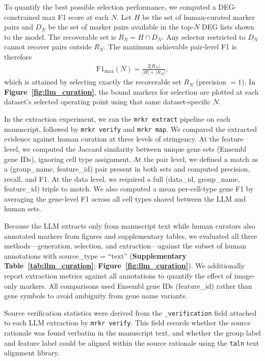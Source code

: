 \documentclass[10pt,twocolumn]{article}
\theoremstyle{plain}
\theoremstyle{definition}
\theoremstyle{remark}
\begin{document}
To quantify the best possible selection performance, we computed a DEG-constrained max F1 score at each $N$. Let $H$ be the set of human-curated marker pairs and $D_N$ be the set of marker pairs available in the top-$N$ DEG lists shown to the model. The recoverable set is $R_N = H \cap D_N$. Any selector restricted to $D_N$ cannot recover pairs outside $R_N$. The maximum achievable pair-level F1 is therefore
\begin{align}
  \mathrm{F1}_{\max}(N) = \frac{2|R_N|}{|H| + |R_N|},
\end{align}
which is attained by selecting exactly the recoverable set $R_N$ (precision $=1$). In \textbf{Figure~\ref{fig:llm_curation}}, the bound markers for selection are plotted at each dataset's selected operating point using that same dataset-specific $N$.

In the extraction experiment, we ran the \texttt{mrkr extract} pipeline on each manuscript, followed by \texttt{mrkr verify} and \texttt{mrkr map}. We compared the extracted evidence against human curation at three levels of stringency. At the feature level, we computed the Jaccard similarity between unique gene sets (Ensembl gene IDs), ignoring cell type assignment. At the pair level, we defined a match as a (group\_name, feature\_id) pair present in both sets and computed precision, recall, and F1. At the data level, we required a full (data\_id, group\_name, feature\_id) triple to match. We also computed a mean per-cell-type gene F1 by averaging the gene-level F1 across all cell types shared between the LLM and human sets.

Because the LLM extracts only from manuscript text while human curators also annotated markers from figures and supplementary tables, we evaluated all three methods---generation, selection, and extraction---against the subset of human annotations with source\_type = ``text'' (\textbf{Supplementary Table~\ref{tab:llm_curation}}; \textbf{Figure~\ref{fig:llm_curation}}). We additionally report extraction metrics against all annotations to quantify the effect of image-only markers. All comparisons used Ensembl gene IDs (feature\_id) rather than gene symbols to avoid ambiguity from gene name variants.

Source verification statistics were derived from the \texttt{\_verification} field attached to each LLM extraction by \texttt{mrkr verify}. This field records whether the source rationale was found verbatim in the manuscript text, and whether the group label and feature label could be aligned within the source rationale using the \texttt{taln} text alignment library.
\end{document}
